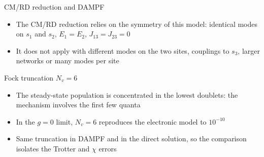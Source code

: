 \documentclass[aspectratio=169,11pt]{beamer}
\begin{document}
\begin{frame}{CM/RD reduction and DAMPF}
  \begin{itemize}\setlength\itemsep{0.8em}
    \item The CM/RD reduction relies on the symmetry of this model: identical modes on $s_1$ and $s_2$, $E_1=E_2$, $J_{13}=J_{23}=0$
    \item It does not apply with different modes on the two sites, couplings to $s_3$, larger networks or many modes per site
  \end{itemize}
\end{frame}

\begin{frame}{Fock truncation $N_v=6$}
  \begin{itemize}\setlength\itemsep{0.8em}
    \item The steady-state population is concentrated in the lowest doublets: the mechanism involves the first few quanta
    \item In the $g=0$ limit, $N_v=6$ reproduces the electronic model to $10^{-10}$
    \item Same truncation in DAMPF and in the direct solution, so the comparison isolates the Trotter and $\chi$ errors
  \end{itemize}
\end{frame}
\end{document}
